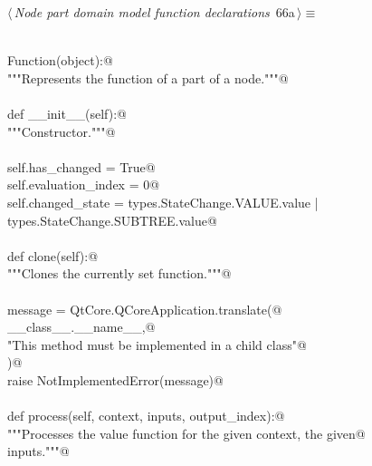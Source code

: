 \documentclass[
    a4paper,      %
    10pt,         %
    openright,    %
    notitlepage,  %
    parskip=half, %
]{scrreprt}       %
\theoremstyle{definition}                    %
\begin{document}
\begin{flushleft} \small
\begin{minipage}{\linewidth}\label{scrap108}\raggedright\small
{} $\langle\,${\itshape Node part domain model function declarations}\nobreak\ {\footnotesize {66a}}$\,\rangle\equiv$
\vspace{-1exm}
\begin{list}{}{} \item
\mbox{}\lstinline@@\\
\mbox{}\lstinline@class Function(object):@\\
\mbox{}\lstinline@    """Represents the function of a part of a node."""@\\
\mbox{}\lstinline@@\\
\mbox{}\lstinline@    def __init__(self):@\\
\mbox{}\lstinline@        """Constructor."""@\\
\mbox{}\lstinline@@\\
\mbox{}\lstinline@        self.has_changed = True@\\
\mbox{}\lstinline@        self.evaluation_index = 0@\\
\mbox{}\lstinline@        self.changed_state = types.StateChange.VALUE.value | types.StateChange.SUBTREE.value@\\
\mbox{}\lstinline@@\\
\mbox{}\lstinline@    def clone(self):@\\
\mbox{}\lstinline@        """Clones the currently set function."""@\\
\mbox{}\lstinline@@\\
\mbox{}\lstinline@        message = QtCore.QCoreApplication.translate(@\\
\mbox{}\lstinline@            __class__.__name__,@\\
\mbox{}\lstinline@            "This method must be implemented in a child class"@\\
\mbox{}\lstinline@        )@\\
\mbox{}\lstinline@        raise NotImplementedError(message)@\\
\mbox{}\lstinline@@\\
\mbox{}\lstinline@    def process(self, context, inputs, output_index):@\\
\mbox{}\lstinline@        """Processes the value function for the given context, the given@\\
\mbox{}\lstinline@        inputs."""@\\
\mbox{}\lstinline@@\\

\end{list}
\end{minipage}
\end{flushleft}
\end{document}
